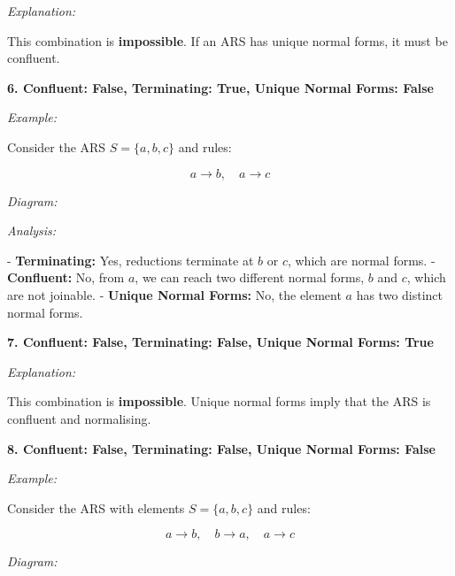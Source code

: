 \documentclass{article}
\theoremstyle{theorem}
\theoremstyle{definition}
\theoremstyle{remark}
\begin{document}
\textit{Explanation:}

This combination is \textbf{impossible}. If an ARS has unique normal forms, it must be confluent.


\textbf{6. Confluent: False, Terminating: True, Unique Normal Forms: False}

\textit{Example:}

Consider the ARS \( S = \{ a, b, c \} \) and rules:

\[
  a \to b, \quad a \to c
\]

\textit{Diagram:}

\begin{center}
\end{center}

\textit{Analysis:}

- \textbf{Terminating:} Yes, reductions terminate at \( b \) or \( c \), which are normal forms.
- \textbf{Confluent:} No, from \( a \), we can reach two different normal forms, \( b \) and \( c \), which are not joinable.
- \textbf{Unique Normal Forms:} No, the element \( a \) has two distinct normal forms.


\textbf{7. Confluent: False, Terminating: False, Unique Normal Forms: True}

\textit{Explanation:}

This combination is \textbf{impossible}. Unique normal forms imply that the ARS is confluent and normalising.


\textbf{8. Confluent: False, Terminating: False, Unique Normal Forms: False}

\textit{Example:}

Consider the ARS with elements \( S = \{ a, b, c \} \) and rules:

\[
  a \to b, \quad b \to a, \quad a \to c
\]

\textit{Diagram:}

\begin{center}
\end{center}
\end{document}
